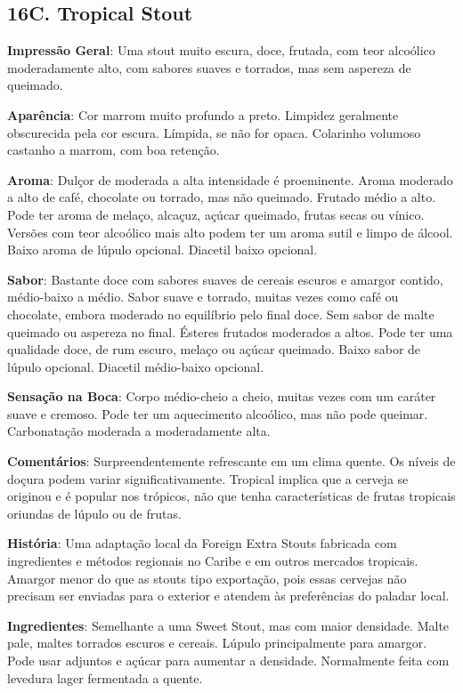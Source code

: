 \subsection*{16C. Tropical Stout}
\textbf{Impressão Geral}: Uma stout muito escura, doce, frutada, com teor alcoólico moderadamente alto, com sabores suaves e torrados, mas sem aspereza de queimado.

\textbf{Aparência}: Cor marrom muito profundo a preto. Limpidez geralmente obscurecida pela cor escura. Límpida, se não for opaca. Colarinho volumoso castanho a marrom, com boa retenção.

\textbf{Aroma}: Dulçor de moderada a alta intensidade é proeminente. Aroma moderado a alto de café, chocolate ou torrado, mas não queimado. Frutado médio a alto. Pode ter aroma de melaço, alcaçuz, açúcar queimado, frutas secas ou vínico. Versões com teor alcoólico mais alto podem ter um aroma sutil e limpo de álcool. Baixo aroma de lúpulo opcional. Diacetil baixo opcional.

\textbf{Sabor}: Bastante doce com sabores suaves de cereais escuros e amargor contido, médio-baixo a médio. Sabor suave e torrado, muitas vezes como café ou chocolate, embora moderado no equilíbrio pelo final doce. Sem sabor de malte queimado ou aspereza no final. Ésteres frutados moderados a altos. Pode ter uma qualidade doce, de rum escuro, melaço ou açúcar queimado. Baixo sabor de lúpulo opcional. Diacetil médio-baixo opcional.

\textbf{Sensação na Boca}: Corpo médio-cheio a cheio, muitas vezes com um caráter suave e cremoso. Pode ter um aquecimento alcoólico, mas não pode queimar. Carbonatação moderada a moderadamente alta.

\textbf{Comentários}: Surpreendentemente refrescante em um clima quente. Os níveis de doçura podem variar significativamente. Tropical implica que a cerveja se originou e é popular nos trópicos, não que tenha características de frutas tropicais oriundas de lúpulo ou de frutas.

\textbf{História}: Uma adaptação local da Foreign Extra Stouts fabricada com ingredientes e métodos regionais no Caribe e em outros mercados tropicais. Amargor menor do que as stouts tipo exportação, pois essas cervejas não precisam ser enviadas para o exterior e atendem às preferências do paladar local.

\textbf{Ingredientes}: Semelhante a uma Sweet Stout, mas com maior densidade. Malte pale, maltes torrados escuros e cereais. Lúpulo principalmente para amargor. Pode usar adjuntos e açúcar para aumentar a densidade. Normalmente feita com levedura lager fermentada a quente.

